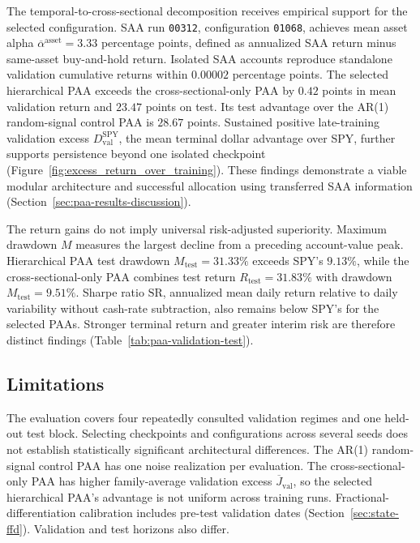 The temporal-to-cross-sectional decomposition receives empirical support for the selected configuration. SAA run \texttt{00312}, configuration \texttt{01068}, achieves mean asset alpha \(\overline\alpha^{\mathrm{asset}}=3.33\) percentage points, defined as annualized SAA return minus same-asset buy-and-hold return. Isolated SAA accounts reproduce standalone validation cumulative returns within \(0.00002\) percentage points. The selected hierarchical PAA exceeds the cross-sectional-only PAA by \(0.42\) points in mean validation return and \(23.47\) points on test. Its test advantage over the AR(1) random-signal control PAA is \(28.67\) points. Sustained positive late-training validation excess \(D_{\mathrm{val}}^{\mathrm{SPY}}\), the mean terminal dollar advantage over SPY, further supports persistence beyond one isolated checkpoint (Figure~\ref{fig:excess_return_over_training}). These findings demonstrate a viable modular architecture and successful allocation using transferred SAA information (Section~\ref{sec:paa-results-discussion}).

The return gains do not imply universal risk-adjusted superiority. Maximum drawdown \(M\) measures the largest decline from a preceding account-value peak. Hierarchical PAA test drawdown \(M_{\mathrm{test}}=31.33\%\) exceeds SPY's \(9.13\%\), while the cross-sectional-only PAA combines test return \(R_{\mathrm{test}}=31.83\%\) with drawdown \(M_{\mathrm{test}}=9.51\%\). Sharpe ratio \(\mathrm{SR}\), annualized mean daily return relative to daily variability without cash-rate subtraction, also remains below SPY's for the selected PAAs. Stronger terminal return and greater interim risk are therefore distinct findings (Table~\ref{tab:paa-validation-test}).

\subsection{Limitations}
\label{sec:limitations}

The evaluation covers four repeatedly consulted validation regimes and one held-out test block. Selecting checkpoints and configurations across several seeds does not establish statistically significant architectural differences. The AR(1) random-signal control PAA has one noise realization per evaluation. The cross-sectional-only PAA has higher family-average validation excess \(\overline J_{\mathrm{val}}\), so the selected hierarchical PAA's advantage is not uniform across training runs. Fractional-differentiation calibration includes pre-test validation dates (Section~\ref{sec:state-ffd}). Validation and test horizons also differ.

